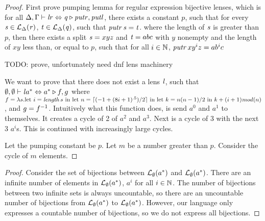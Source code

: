 \blic*
\begin{proof}
First prove pumping lemma for regular expression bijective lenses,
which is for all
$\Delta, \Gamma \vdash \mathit{l} \mathit{r} \Leftrightarrow \mathit{q} \triangleright \mathit{putr},\mathit{putl}$,
there exists a constant $p$,
such that for every $\mathit{s}\in\mathcal{L}_{\Delta}(\mathit{r})$,
$\mathit{t}\in\mathcal{L}_{\Delta}(\mathit{q})$,
such that $\mathit{putr} \, \mathit{s} = \mathit{t}$.
where the length of $\mathit{s}$ is greater than $p$,
then there exists a split $\mathit{s} = xyz$ and $\mathit{t} = abc$
with $y$ nonempty and the length of $xy$ less than, or equal to $p$,
such that for all $i\in\mathbb{N}$, $\mathit{putr} \, xy^iz = ab^ic$

TODO: prove, unfortunately need dnf lens machinery

We want to prove that there does not exist a lens $\mathit{l}$, such that
$\emptyset,\emptyset \vdash \mathit{l} a^* \Leftrightarrow a^* \triangleright f,g$
where $f = \lambda s.\text{let } i = \mathit{length} \, s\text{ in }
\text{let } n = \lceil(-1+(8i+1)^{.5})/2\rceil\text{ in }
\text{let } k = n(n-1)/2\text{ in }
k+(i+1)\mathit{mod}(n)$, and $g=f^{-1}$.
Intuitively what this function does, is send $a^0$ and $a^1$ to themselves.
It creates a cycle of 2 of $a^2$ and $a^3$.  Next is a cycle of 3 with the next 3 $a^i$s.
This is continued with increasingly large cycles.

Let the pumping constant be $p$.  Let $m$ be a number greater than $p$.  Consider
the cycle of $m$ elements.

\end{proof}
\begin{proof}
Consider the set of bijections between
$\mathcal{L}_{\emptyset}(a^*)$ and $\mathcal{L}_{\emptyset}(a^*)$.
There are an infinite number of elements in $\mathcal{L}_{\emptyset}(a^*)$,
$a^i$ for all $i\in\mathbb{N}$.
The number of bijections between two infinite sets is always uncountable, so there
are an uncountable number of bijections from $\mathcal{L}_{\emptyset}(a^*)$
to $\mathcal{L}_{\emptyset}(a^*)$.
However, our language only expresses a countable number of bijections,
so we do not express all bijections.
\end{proof}

